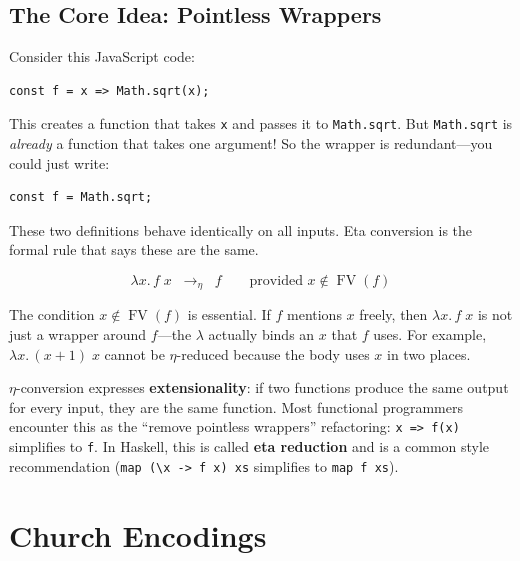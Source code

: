 \documentclass[11pt,a4paper]{article}
\theoremstyle{definition}
\newcommand{\lam}{\lambda}
\newcommand{\ef}{\longrightarrow_\eta}
\newcommand{\FV}{\operatorname{FV}}
\begin{document}
\subsection{The Core Idea: Pointless Wrappers}

Consider this JavaScript code:

\begin{verbatim}
const f = x => Math.sqrt(x);
\end{verbatim}

This creates a function that takes \texttt{x} and passes it to
\texttt{Math.sqrt}. But \texttt{Math.sqrt} is \emph{already} a function that
takes one argument! So the wrapper is redundant---you could just write:

\begin{verbatim}
const f = Math.sqrt;
\end{verbatim}

These two definitions behave identically on all inputs. Eta conversion is the
formal rule that says these are the same.

\begin{defnbox}
\[
  \lam x.\, f\; x \;\;\ef\;\; f
  \qquad\text{provided } x \notin \FV(f)
\]
\end{defnbox}

The condition $x \notin \FV(f)$ is essential. If $f$ mentions $x$ freely,
then $\lam x.\, f\; x$ is not just a wrapper around $f$---the $\lam$
actually binds an $x$ that $f$ uses. For example, $\lam x.\, (x + 1)\; x$
cannot be $\eta$-reduced because the body uses $x$ in two places.

\begin{intuition}
$\eta$-conversion expresses \textbf{extensionality}: if two functions produce
the same output for every input, they are the same function. Most functional
programmers encounter this as the ``remove pointless wrappers'' refactoring:
\texttt{x => f(x)} simplifies to \texttt{f}. In Haskell, this is called
\textbf{eta reduction} and is a common style recommendation
(\texttt{map (\textbackslash x -> f x) xs} simplifies to \texttt{map f xs}).
\end{intuition}

\section{Church Encodings}\label{sec:church}
\end{document}
